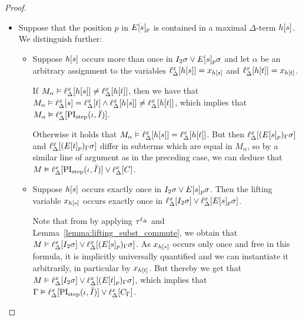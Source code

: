 \begin{proof}
\begin{indproof}
\begin{itemize}
				\item
					Suppose that the position $p$ in $E{[s]_{p}}$ is contained in a maximal $\Delta$-term $h[s]$.
					We distinguish further:

					\begin{itemize}
						\item Suppose $h[s]$ occurs more than once in $I_2\sigma \lor E{[s]_{p}}\sigma$ and let $\alpha$ be an arbitrary assignment to the variables $\ell_{\Delta}^{x}[h[s]] = x_{h[s]}$ and $\ell_{\Delta}^{x}[h[t]] = x_{h[t]}$.

							If $M_\alpha \vDash \ell_{\Delta}^{x}[h[s]] \neq \ell_{\Delta}^{x}[h[t]]$, then we have that $M_\alpha \entails \lifdelta{s}\nolinebreak=\lifdelta{t} \land\allowbreak \lifdelta{h\occ{s}} \neq \lifdelta{h\occ{t}}$, which implies that $M_\alpha \vDash \ell_{\Delta}^{x}[\operatorname{PI}_{\mathrm{step}}(\iota, \bar I)]$.

							Otherwise it holds that $M_\alpha \vDash \ell_{\Delta}^{x}[h[s]] = \ell_{\Delta}^{x}[h[t]]$.
							But then 
							$\ell_{\Delta}^{x}[(E{[s]_{p}})_\Gamma\sigma]$
							and
							$\ell_{\Delta}^{x}[(E{[t]_{p}})_\Gamma\sigma]$
							differ in subterms which are equal in $M_\alpha$,
							so by a similar line of argument as in the preceding case, we can deduce that $M \vDash \ell_{\Delta}^{x}[\operatorname{PI}_{\mathrm{step}}(\iota, \bar I)] \lor \ell_{\Delta}^{x}[C]$.

						\item Suppose $h[s]$ occurs exactly once in $I_2\sigma \lor E{[s]_{p}}\sigma$.
							Then the lifting variable $x_{h[s]}$
							occurs exactly once in $\ell_{\Delta}^{x}[I_2\sigma] \lor \ell_{\Delta}^{x}[E{[s]_{p}}\sigma]$.

							Note that from \markB{} by applying $\tau^{\ell_\Delta}$ and Lemma~\ref{lemma:lifting_subst_commute}, we obtain that $M\vDash \ell_{\Delta}^{x}[I_2\sigma] \lor \ell_{\Delta}^{x}[(E{[s]_{p}})_\Gamma\sigma]$.
							As $x_{h[s]}$ occurs only once and free in this formula, it is implicitly universally quantified and we can instantiate it arbitrarily, in particular by $x_{h[t]}$.
							But thereby we get that 
							$M\vDash \ell_{\Delta}^{x}[I_2\sigma] \lor \ell_{\Delta}^{x}[(E{[t]_{p}})_\Gamma\sigma]$, 
							which implies that
							$\Gamma\vDash \ell_{\Delta}^{x}[\operatorname{PI}_{\mathrm{step}}(\iota, \bar I)] \lor \ell_{\Delta}^{x}[C_\Gamma]$.
							\qedhere
					\end{itemize}
			\end{itemize}

	\end{indproof}
\end{proof}

